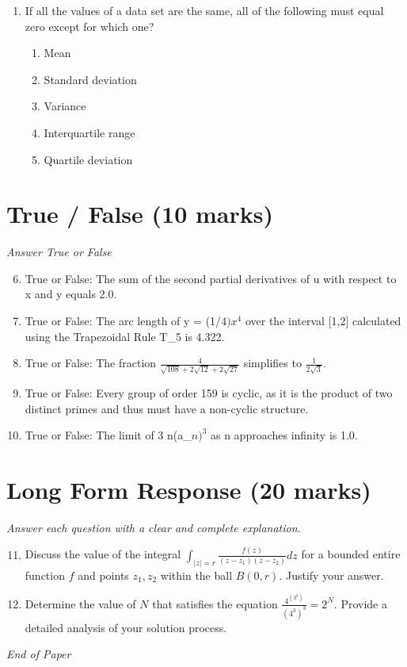 \documentclass[12pt]{article}
\begin{document}
\begin{enumerate}[label=\arabic*.]
\begin{enumerate}[label=(\alph*)]
    \item 25.25
    \item 23.75
    \item 21.75
\end{enumerate}
\item If all the values of a data set are the same, all of the following must equal zero except for which one?
\begin{enumerate}[label=(\alph*)]
    \item Mean
    \item Standard deviation
    \item Variance
    \item Interquartile range
    \item Quartile deviation
\end{enumerate}
\end{enumerate}

\section*{True / False (10 marks)}
\textit{Answer True or False}
\begin{enumerate}[label=\arabic*.]
\setcounter{enumi}{5}
\item True or False: The sum of the second partial derivatives of u with respect to x and y equals 2.0.
\item True or False: The arc length of y = (1/$4)x^4$ over the interval [1,2] calculated using the Trapezoidal Rule T\_5 is 4.322.
\item True or False: The fraction \( \frac{4}{\sqrt{108}+2\sqrt{12}+2\sqrt{27}} \) simplifies to \( \frac{1}{2\sqrt{3}} \).
\item True or False: Every group of order 159 is cyclic, as it is the product of two distinct primes and thus must have a non-cyclic structure.
\item True or False: The limit of 3 n(a\_$n)^3$ as n approaches infinity is 1.0.
\end{enumerate}

\section*{Long Form Response (20 marks)}
\textit{Answer each question with a clear and complete explanation.}
\begin{enumerate}[label=\arabic*.]
\setcounter{enumi}{10}
\item Discuss the value of the integral $\int_{|z|=r} \frac{f(z)}{(z-z_1)(z-z_2)} dz$ for a bounded entire function $f$ and points $z_1, z_2$ within the ball $B(0,r)$. Justify your answer.
\item Determine the value of \( N \) that satisfies the equation \( \frac{4^{(3^3)}}{(4^3)^3} = 2^N \). Provide a detailed analysis of your solution process.
\end{enumerate}

\vfill
\noindent\textit{End of Paper}
\end{document}
